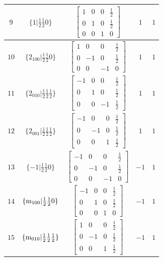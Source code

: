 \documentclass[fleqn,8pt]{jsarticle}
\begin{document}
\begin{longtable}{ccccc}
$ 9 $ & $ \{1|\frac{1}{2} \frac{1}{2} 0\} $ & $ \begin{bmatrix} 1 & 0 & 0 & \frac{1}{2} \\ 0 & 1 & 0 & \frac{1}{2} \\ 0 & 0 & 1 & 0 \end{bmatrix} $ & $ 1 $ & $ 1 $ \\ \hline
$ 10 $ & $ \{2{}_{100}|\frac{1}{2} \frac{1}{2} 0\} $ & $ \begin{bmatrix} 1 & 0 & 0 & \frac{1}{2} \\ 0 & -1 & 0 & \frac{1}{2} \\ 0 & 0 & -1 & 0 \end{bmatrix} $ & $ 1 $ & $ 1 $ \\ \hline
$ 11 $ & $ \{2{}_{010}|\frac{1}{2} \frac{1}{2} \frac{1}{2}\} $ & $ \begin{bmatrix} -1 & 0 & 0 & \frac{1}{2} \\ 0 & 1 & 0 & \frac{1}{2} \\ 0 & 0 & -1 & \frac{1}{2} \end{bmatrix} $ & $ 1 $ & $ 1 $ \\ \hline
$ 12 $ & $ \{2{}_{001}|\frac{1}{2} \frac{1}{2} \frac{1}{2}\} $ & $ \begin{bmatrix} -1 & 0 & 0 & \frac{1}{2} \\ 0 & -1 & 0 & \frac{1}{2} \\ 0 & 0 & 1 & \frac{1}{2} \end{bmatrix} $ & $ 1 $ & $ 1 $ \\ \hline
$ 13 $ & $ \{-1|\frac{1}{2} \frac{1}{2} 0\} $ & $ \begin{bmatrix} -1 & 0 & 0 & \frac{1}{2} \\ 0 & -1 & 0 & \frac{1}{2} \\ 0 & 0 & -1 & 0 \end{bmatrix} $ & $ -1 $ & $ 1 $ \\ \hline
$ 14 $ & $ \{{\rm m}_{100}|\frac{1}{2} \frac{1}{2} 0\} $ & $ \begin{bmatrix} -1 & 0 & 0 & \frac{1}{2} \\ 0 & 1 & 0 & \frac{1}{2} \\ 0 & 0 & 1 & 0 \end{bmatrix} $ & $ -1 $ & $ 1 $ \\ \hline
$ 15 $ & $ \{{\rm m}_{010}|\frac{1}{2} \frac{1}{2} \frac{1}{2}\} $ & $ \begin{bmatrix} 1 & 0 & 0 & \frac{1}{2} \\ 0 & -1 & 0 & \frac{1}{2} \\ 0 & 0 & 1 & \frac{1}{2} \end{bmatrix} $ & $ -1 $ & $ 1 $ \\ \hline

\end{longtable}
\end{document}
